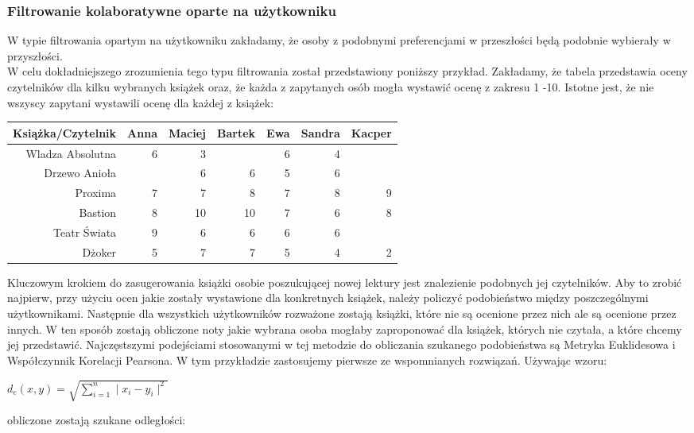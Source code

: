 \documentclass[12pt,a4paper]{report}
\begin{document}
\subsubsection{Filtrowanie kolaboratywne oparte na użytkowniku}
W typie filtrowania opartym na użytkowniku zakładamy, że osoby z podobnymi preferencjami w przeszłości będą podobnie wybierały w przyszłości.
\\W celu dokładniejszego zrozumienia tego typu filtrowania został przedstawiony poniższy przykład.
Zakładamy, że tabela przedstawia oceny czytelników dla kilku wybranych książek oraz, że każda z zapytanych osób mogła wystawić ocenę z zakresu 1 -10. Istotne jest, że nie wszyscy zapytani wystawili ocenę dla każdej z książek:
\begin{center}
\begin{tabular}{|r|r|r|r|r|r|r|} \hline
Książka/Czytelnik & Anna & Maciej & Bartek & Ewa & Sandra & Kacper \\
\hline \hline 
Wladza Absolutna & 6 & 3 & & 6 & 4 &  \\
Drzewo Anioła &  & 6 & 6 & 5 & 6 &  \\
Proxima & 7 & 7 & 8 & 7 & 8 & 9 \\
Bastion & 8 & 10 & 10 & 7 & 6 & 8 \\
Teatr Świata & 9 & 6 & 6 & 6 & 6 &  \\
Dżoker & 5 & 7 & 7 & 5 & 4 & 2 \\
\hline
\end{tabular}
\end{center}
Kluczowym krokiem do zasugerowania książki osobie poszukującej nowej lektury jest znalezienie podobnych jej czytelników. Aby to zrobić najpierw, przy użyciu ocen jakie zostały wystawione dla konkretnych książek, należy policzyć podobieństwo między poszczególnymi użytkownikami. Następnie dla wszystkich użytkowników rozważone zostają książki, które nie są ocenione przez nich ale są ocenione przez innych. W ten sposób zostają obliczone noty jakie wybrana osoba mogłaby zaproponować dla książek, których nie czytała, a które chcemy jej przedstawić. Najczęstszymi podejściami stosowanymi w tej metodzie do obliczania szukanego podobieństwa są Metryka Euklidesowa i Współczynnik Korelacji Pearsona. W tym przykładzie zastosujemy pierwsze ze wspomnianych rozwiązań. Używając wzoru:
\begin{center}
$d_{e}(x,y) = \sqrt{\sum_{i=1}^n \mid x_{i} - y_{i} \mid ^2 }$
\end{center}
obliczone zostają szukane odległości:
\\
\end{document}
